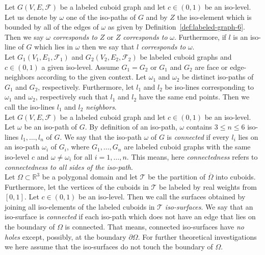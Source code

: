 \documentclass[a4paper,11pt]{article}
\begin{document}
Let $G(V,E,\mathcal{F})$ be a labeled
cuboid graph and let $c\in (0,1)$ be an iso-level. Let us denote by $\omega$ one of the iso-paths
of $G$ and by $Z$ the iso-element which is bounded by all of the edges of $\omega$
as given by Definition~\ref{def:labeled-graph-6}. Then we say $\omega$ {\it corresponds to} $Z$ or $Z$
{\it corresponds to} $\omega$. Furthermore, if $l$ is an iso-line of $G$ which lies in $\omega$ then we say
that $l$ {\it corresponds to} $\omega$.\\

Let $G_1(V_1,E_1,\mathcal{F}_1)$ and $G_2(V_2,E_2,\mathcal{F}_2)$
be labeled cuboid graphs and $c\in (0,1)$ a given iso-level. Assume $G_1=G_2$ or $G_1$ and $G_2$ are
face or edge-neighbors according to the given context. Let $\omega_1$ and $\omega_2$ be distinct
iso-paths of $G_1$ and $G_2$, respectively. Furthermore, let $l_1$ and $l_2$ be iso-lines
corresponding to $\omega_1$ and $\omega_2$, respectively such that $l_1$ and $l_2$ have the same end points.
Then we call the iso-lines $l_1$ and $l_2$ {\it neighbors}.\\

Let $G(V,E,\mathcal{F})$ be a labeled cuboid graph and
let $c\in (0,1)$ be an iso-level. Let $\omega$ be an iso-path of $G$. By definition of an iso-path,
$\omega$ contains $3\leq n\leq 6$ iso-lines $l_1,\ldots,l_n$ of $G$. We say that the iso-path $\omega$
of $G$ is {\it connected} if every $l_i$ lies on an iso-path $\omega_i$ of $G_i$, where $G_1,\ldots,G_n$
are labeled cuboid graphs with the same iso-level $c$ and $\omega\neq \omega_i$ for all $i=1,\ldots,n$.
This means, here {\it connectedness} refers to {\it connectedness to all sides of the iso-path}.\\

Let $\Omega\subset\mathbb{R}^3$ be a
polygonal domain and let $\mathcal{T}$ be the partition of $\overline{\Omega}$ into cuboids.
Furthermore, let the vertices of the cuboids in $\mathcal{T}$ be labeled by real weights from $[0,1]$.
Let $c\in (0,1)$ be an iso-level. Then we call the surfaces obtained by joining all iso-elements
of the labeled cuboids in $\mathcal{T}$ {\it iso-surfaces}. We say that an iso-surface is {\it connected}
if each iso-path which does not have an edge that lies on the boundary of $\Omega$ is connected. That
means, connected iso-surfaces have {\it no holes} except, possibly, at the boundary $\partial\Omega$.
For further theoretical investigations we here assume that the iso-surfaces do not touch the boundary
of $\Omega$.
\end{document}
